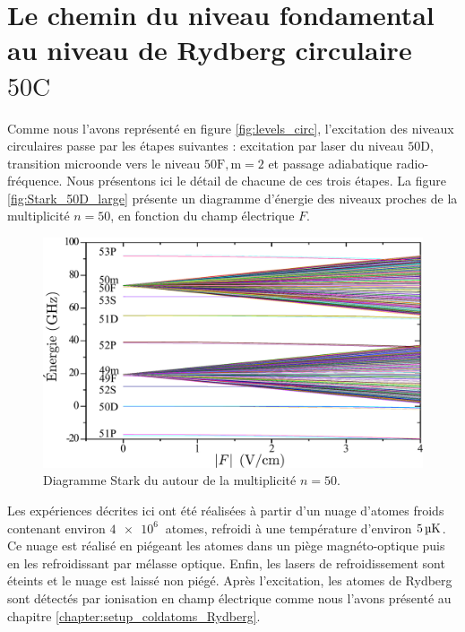 \section{Le chemin du niveau fondamental au niveau de Rydberg circulaire $\mathrm{50C}$}
\noindent Comme nous l'avons représenté en figure \eqref{fig:levels_circ}, l'excitation des niveaux circulaires passe par les étapes suivantes : excitation par laser du niveau $\mathrm{50D}$, transition microonde vers le niveau $\mathrm{50F,m=2}$ et passage adiabatique radio-fréquence.
Nous présentons ici le détail de chacune de ces trois étapes.
La figure \eqref{fig:Stark_50D_large} présente un diagramme d'énergie des niveaux proches de la multiplicité $n=50$, en fonction du champ électrique $F$.
\begin{figure}[h]
\centering
\includegraphics[width=\linewidth]{figures/circulars/Stark_50D_large}
\caption[Diagramme Stark autour de la multiplicité $n=50$]{
Diagramme Stark du  autour de la multiplicité $n=50$.
}
\label{fig:Stark_50D_large}
\end{figure}

Les expériences décrites ici ont été réalisées à partir d'un nuage d'atomes froids contenant environ $\SI{4e6}{}$ atomes, refroidi à une température d'environ $\SI{5}{\si{\micro\kelvin}}$.
Ce nuage est réalisé en piégeant les atomes dans un piège magnéto-optique puis en les refroidissant par mélasse optique.
Enfin, les lasers de refroidissement sont éteints et le nuage est laissé non piégé.
Après l'excitation, les atomes de Rydberg sont détectés par ionisation en champ électrique comme nous l'avons présenté au chapitre \ref{chapter:setup_coldatoms_Rydberg}.

